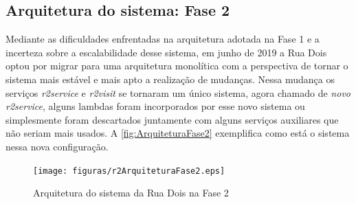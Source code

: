 %


\subsection{Arquitetura do sistema: Fase 2}

Mediante as dificuldades enfrentadas na arquitetura adotada na Fase 1 e a
incerteza sobre a escalabilidade desse sistema, em junho de 2019 a Rua Dois
optou por migrar para uma arquitetura monolítica com a perspectiva de tornar
o sistema mais estável e mais apto a realização de mudanças. Nessa mudança
os serviços \textit{r2service} e \textit{r2visit} se tornaram um único sistema,
agora chamado de \textit{novo r2service}, alguns lambdas foram incorporados por
esse novo sistema ou simplesmente foram descartados juntamente com alguns
serviços auxiliares que não seriam mais usados. A \autoref{fig:ArquiteturaFase2}
exemplifica como está o sistema nessa nova configuração.

\begin{figure}[h]
  \centering
  \texttt{[image: figuras/r2ArquiteturaFase2.eps]}
  \caption{Arquitetura do sistema da Rua Dois na Fase 2\label{fig:ArquiteturaFase2}}
\end{figure}
